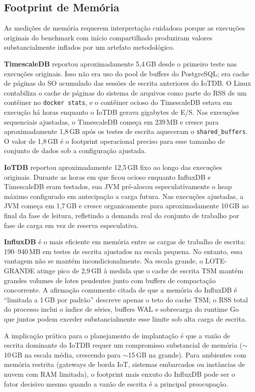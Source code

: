 \subsection{Footprint de Memória}
\label{sec:memory-results}

As medições de memória requerem interpretação cuidadosa porque as execuções originais do
benchmark com início compartilhado produziram valores substancialmente inflados por um artefato
metodológico.

\textbf{TimescaleDB} reportou aproximadamente 5,4\,GB desde o primeiro teste nas execuções
originais. Isso não era uso do pool de buffers do PostgreSQL; era cache de páginas do SO
acumulado das sessões de escrita anteriores do IoTDB. O Linux contabiliza o cache de páginas
do sistema de arquivos como parte do RSS de um contêiner no \texttt{docker stats}, e o
contêiner ocioso do TimescaleDB estava em execução há horas enquanto o IoTDB gerava gigabytes
de E/S. Nas execuções sequenciais ajustadas, o TimescaleDB começa em 239\,MB e cresce para
aproximadamente 1,8\,GB após os testes de escrita aqueceram o \texttt{shared\_buffers}.
O valor de 1,8\,GB é o footprint operacional preciso para esse tamanho de conjunto de dados
sob a configuração ajustada.

\textbf{IoTDB} reportou aproximadamente 12,5\,GB fixo ao longo das execuções originais.
Durante as horas em que ficou ocioso enquanto InfluxDB e TimescaleDB eram testados, sua JVM
pré-alocou especulativamente o heap máximo configurado em antecipação a carga futura. Nas
execuções ajustadas, a JVM começa em 1,7\,GB e cresce organicamente para aproximadamente
10\,GB ao final da fase de leitura, refletindo a demanda real do conjunto de trabalho por
fase de carga em vez de reserva especulativa.

\textbf{InfluxDB} é o mais eficiente em memória entre as cargas de trabalho de escrita:
190--940\,MB em testes de escrita ajustados na escala pequena. No entanto, essa vantagem não
se mantém incondicionalmente. Na escala grande, o LOTE-GRANDE atinge pico de 2,9\,GB à medida
que o cache de escrita TSM mantém grandes volumes de lotes pendentes junto com buffers de
compactação concorrente. A afirmação comumente citada de que a memória do InfluxDB é ``limitada
a 1\,GB por padrão'' descreve apenas o teto do cache TSM; o RSS total do processo inclui o
índice de séries, buffers WAL e sobrecarga do runtime Go que juntos podem exceder
substancialmente esse limite sob alta carga de escrita.

A implicação prática para o planejamento de implantação é que a vazão de escrita dominante do
IoTDB requer um compromisso substancial de memória ($\sim$10\,GB na escala média, crescendo
para $\sim$15\,GB na grande). Para ambientes com memória restrita (gateways de borda IoT,
sistemas embarcados ou instâncias de nuvem com RAM limitada), o footprint mais enxuto do
InfluxDB pode ser o fator decisivo mesmo quando a vazão de escrita é a principal preocupação.

